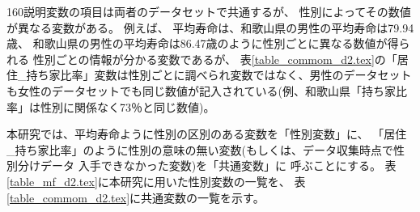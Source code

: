 160説明変数の項目は両者のデータセットで共通するが、
性別によってその数値が異なる変数がある。
例えば、
平均寿命は、和歌山県の男性の平均寿命は79.94歳、
和歌山県の男性の平均寿命は86.47歳のように性別ごとに異なる数値が得られる
性別ごとの情報が分かる変数であるが、
表\ref{table_commom_d2.tex}の「居住\_持ち家比率」変数は性別ごとに調べられ変数ではなく、男性のデータセットも女性のデータセットでも同じ数値が記入されている(例、和歌山県「持ち家比率」は性別に関係なく73％と同じ数値)。

%


本研究では、平均寿命ように性別の区別のある変数を「性別変数」に、
「居住\_持ち家比率」のように性別の意味の無い変数(もしくは、データ収集時点で性別分けデータ
入手できなかった変数)を「共通変数」に
呼ぶことにする。
表\ref{table_mf_d2.tex}に本研究に用いた性別変数の一覧を、
表\ref{table_commom_d2.tex}に共通変数の一覧を示す。



%


%






%
%
%
%
%

%
%



%

